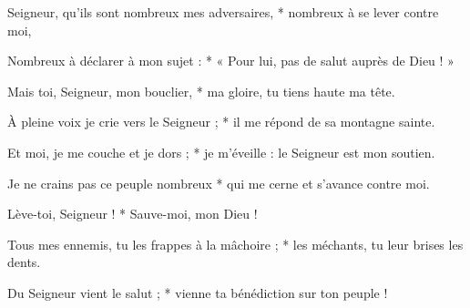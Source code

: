 \item Seigneur, qu'ils sont nombreux mes adversaires, * nombreux à se lever contre moi,
\item Nombreux à déclarer à mon sujet : * « Pour lui, pas de salut auprès de Dieu ! »
\item Mais toi, Seigneur, mon bouclier, * ma gloire, tu tiens haute ma tête.
\item À pleine voix je crie vers le Seigneur ; * il me répond de sa montagne sainte.
\item Et moi, je me couche et je dors ; * je m'éveille : le Seigneur est mon soutien.
\item Je ne crains pas ce peuple nombreux * qui me cerne et s'avance contre moi.
\item Lève-toi, Seigneur ! * Sauve-moi, mon Dieu !
\item Tous mes ennemis, tu les frappes à la mâchoire ; * les méchants, tu leur brises les dents.
\item Du Seigneur vient le salut ; * vienne ta bénédiction sur ton peuple !
